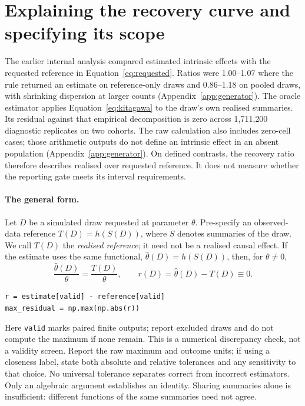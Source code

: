 \section{Explaining the recovery curve and specifying its scope}
\label{sec:blind}

The earlier internal analysis compared estimated intrinsic effects with the
requested reference in Equation~\ref{eq:requested}. Ratios were 1.00--1.07
where the rule returned an estimate on reference-only draws and 0.86--1.18 on
pooled draws, with shrinking dispersion at larger counts
(Appendix~\ref{app:generator}). The oracle estimator applies
Equation~\ref{eq:kitagawa} to the draw's own realised summaries. Its residual
against that empirical decomposition is zero across 1{,}711{,}200 diagnostic
replicates on two cohorts. The raw calculation also includes zero-cell cases;
those arithmetic outputs do not define an intrinsic effect in an absent
population (Appendix~\ref{app:generator}). On defined contrasts, the recovery
ratio therefore describes realised over requested reference. It does not
measure whether the reporting gate meets its interval requirements.

\paragraph{The general form.}
Let $D$ be a simulated draw requested at parameter $\theta$. Pre-specify an
observed-data reference $T(D)=h(S(D))$, where $S$ denotes summaries of the draw.
We call $T(D)$ the \emph{realised reference}; it need not be a realised causal
effect. If the estimate uses the same functional,
$\hat\theta(D)=h(S(D))$, then, for $\theta\ne0$,
\[
\frac{\hat\theta(D)}{\theta}=\frac{T(D)}{\theta},
\qquad r(D)=\hat\theta(D)-T(D)\equiv0.
\]
\begin{center}
\texttt{r = estimate[valid] - reference[valid]}\\
\texttt{max\_residual = np.max(np.abs(r))}
\end{center}
Here \texttt{valid} marks paired finite outputs; report excluded draws and do
not compute the maximum if none remain. This is a numerical discrepancy check, not a validity screen. Report the
raw maximum and outcome units; if using a closeness label, state both absolute
and relative tolerances and any sensitivity to that choice. No universal
tolerance separates correct from incorrect estimators. Only an algebraic
argument establishes an identity. Sharing summaries alone
is insufficient: different functions of the same summaries need not agree.

